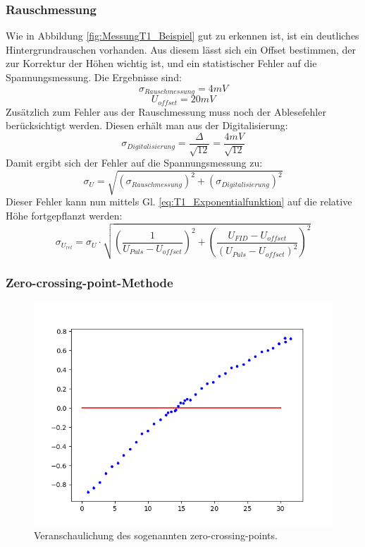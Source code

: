 \documentclass[12pt,a4paper]{article}
\begin{document}
\subsubsection{Rauschmessung}
Wie in Abbildung \ref{fig:MessungT1_Beispiel} gut zu erkennen ist, ist ein deutliches Hintergrundrauschen vorhanden. Aus diesem lässt sich ein Offset bestimmen, der zur Korrektur der Höhen wichtig ist, und ein statistischer Fehler auf die Spannungsmessung. Die Ergebnisse sind:
\begin{equation*}
\sigma _{Rauschmessung} = 4 mV
\end{equation*}
\begin{equation*}
U_{offset} = 20 mV
\end{equation*}
Zusätzlich zum Fehler aus der Rauschmessung muss noch der Ablesefehler berücksichtigt werden. Diesen erhält man aus der Digitalisierung:
\begin{equation*}
\sigma _{Digitalisierung} = \dfrac{\Delta}{\sqrt{12}} = \dfrac{4 mV}{\sqrt{12}}
\end{equation*}
Damit ergibt sich der Fehler auf die Spannungsmessung zu:
\begin{equation*}
\sigma _U = \sqrt{\left(\sigma _{Rauschmessung} \right)^2 + \left(\sigma _{Digitalisierung} \right)^2}
\end{equation*}
Dieser Fehler kann nun mittels Gl. \ref{eq:T1_Exponentialfunktion} auf die relative Höhe fortgepflanzt werden:
\begin{equation*}
\sigma _{U_{rel}} = \sigma _U \cdot \sqrt{\left(\dfrac{1}{U_{Puls} - U_{offset}}\right)^2 + \left(\dfrac{U_{FID} - U_{offset}}{(U_{Puls} - U_{offset})^2}\right)^2}
\end{equation*}


\subsubsection{Zero-crossing-point-Methode}

\begin{figure}
\centering
\includegraphics[scale=0.7]{Bilder/T1_ZeroCrossingPoint.PNG}
\caption{Veranschaulichung des sogenannten zero-crossing-points.}
\label{fig:T1_Zero_Crossing}
\end{figure}
\end{document}
